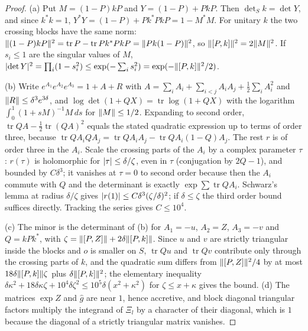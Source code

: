 \begin{proof}
(a) Put $M=(1-P)kP$ and $Y=(1-P)+PkP$. Then $\det_Sk=\det Y$, and since $k^*k=1$, $Y^*Y=(1-P)+Pk^*PkP=1-M^*M$. For unitary $k$ the two crossing blocks have the same norm: $\lVert (1-P)kP\rVert^2=\operatorname{tr}P-\operatorname{tr}Pk^*PkP=\lVert Pk(1-P)\rVert^2$, so
$\lVert [P,k]\rVert^2=2\lVert M\rVert^2$. If $s_i\le1$ are the singular values of $M$, $\lvert \det Y\rvert^2=\prod_i(1-s_i^2)\le\exp(-\sum_is_i^2)=\exp(-\lVert [P,k]\rVert^2/2)$.

(b) Write $e^{A_1}e^{A_2}e^{A_3}=1+A+R$ with $A=\sum_iA_i+\sum_{i<j}A_iA_j+\frac12\sum_iA_i^2$ and $\lVert R\rVert\le\delta^3e^{3\delta}$, and $\log\det(1+QX)=\operatorname{tr}\log(1+QX)$ with the logarithm $\int_0^1(1+sM)^{-1}M\,ds$ for $\lVert M\rVert\le1/2$. Expanding to
second order, $\operatorname{tr}Q A-\frac12\operatorname{tr}(QA)^2$ equals the stated quadratic expression up to terms of order three, because $\operatorname{tr}QA_iQA_j=\operatorname{tr}QA_iA_j-\operatorname{tr}QA_i(1-Q)A_j$. The rest $r$ is of order three in the $A_i$. Scale the crossing parts of the $A_i$
by a complex parameter $\tau$: $r(\tau)$ is holomorphic for $\lvert \tau\rvert\le\delta/\zeta$, even in $\tau$ (conjugation by $2Q-1$), and bounded by $C\delta^3$; it vanishes at $\tau=0$ to second order because then the $A_i$ commute with $Q$ and the
determinant is exactly $\exp\sum\operatorname{tr}QA_i$. Schwarz's lemma at radius $\delta/\zeta$ gives $\lvert r(1)\rvert\le C\delta^3(\zeta/\delta)^2$; if $\delta\le\zeta$ the third order bound suffices directly. Tracking the series gives $C\le10^4$.

(c) The minor is the determinant of (b) for $A_1=-u$, $A_2=Z$, $A_3=-v$ and $Q=kPk^*$, with $\zeta=\lVert [P,Z]\rVert+2\delta\lVert [P,k]\rVert$. Since $u$ and $v$ are strictly triangular inside the blocks and $o$ is smaller on $S$, $\operatorname{tr}Qu$ and $\operatorname{tr}Qv$
contribute only through the crossing parts of $k$, and the quadratic sum differs from $\lVert [P,Z]\rVert^2/4$ by at most $18\delta\lVert [P,k]\rVert\zeta$ plus $\delta\lVert [P,k]\rVert^2$; the elementary inequality
$\delta\kappa^2+18\delta\kappa\zeta+10^4\delta\zeta^2\le10^5\delta(x^2+\kappa^2)$ for $\zeta\le x+\kappa$ gives the bound. (d) The matrices $\exp Z$ and $\hat g$ are near $1$, hence accretive, and block diagonal triangular factors multiply the
integrand of $\Xi_l$ by a character of their diagonal, which is $1$ because the diagonal of a strictly triangular matrix vanishes.
\end{proof}

